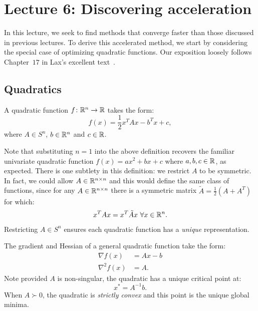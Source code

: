 \section{Lecture 6: Discovering acceleration}

In this lecture, we seek to find methods that converge faster than those
discussed in previous lectures. To derive this accelerated method, we start by
considering the special case of optimizing quadratic functions. Our exposition
loosely follows Chapter~$17$ in Lax's excellent text~\cite{lax}.

\subsection{Quadratics}

\begin{definition} A quadratic function $f\colon\mathbb{R}^n \to \mathbb{R}$ takes the form: 
\begin{equation*}
f(x) = \frac{1}{2}x^T A x - b^T x + c,
\end{equation*}
where $A \in S^n$, $b \in \mathbb{R}^n$ and $c \in \mathbb{R}$.
\end{definition}

Note that substituting $n=1$ into the above definition recovers the familiar univariate quadratic function $f(x) = ax^2 + bx + c$ where $a, b, c \in \mathbb{R}$, as expected. There is one subtlety in this definition: we restrict $A$ to be symmetric. In fact, we could allow $A \in \mathbb{R}^{n \times n}$ and this would define the same class of functions, since for any $A \in \mathbb{R}^{n \times n}$ there is a symmetric matrix $\tilde{A} = \frac{1}{2}\left(A + A^T\right)$ for which:
\begin{equation*}
x^TAx = x^T \tilde{A} x\ \forall x \in \mathbb{R}^n.
\end{equation*}
Restricting $A \in S^n$ ensures each quadratic function has a \textit{unique} representation.

The gradient and Hessian of a general quadratic function take the form:
\begin{align*}
\nabla f(x) &= Ax - b \\
\nabla^2 f(x) &= A.
\end{align*}
Note provided $A$ is non-singular, the quadratic has a unique critical point at:
\begin{equation*}
x^* = A^{-1}b.
\end{equation*}
When $A \succ 0$, the quadratic is \textit{strictly convex} and this point is the unique global minima.

